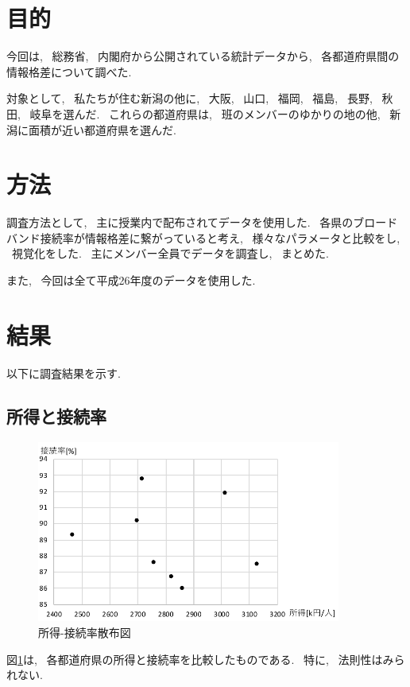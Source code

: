 \documentclass{jsarticle}
\begin{document}
\section{目的}
    今回は, ~総務省, ~内閣府から公開されている統計データから,
    ~各都道府県間の情報格差について調べた.

    対象として, ~私たちが住む新潟の他に, ~大阪, ~山口, ~福岡,
    ~福島, ~長野, ~秋田, ~岐阜を選んだ.
    ~これらの都道府県は, ~班のメンバーのゆかりの地の他,
    ~新潟に面積が近い都道府県を選んだ.

\section{方法}
    調査方法として, ~主に授業内で配布されてデータを使用した.
    ~各県のブロードバンド接続率が情報格差に繋がっていると考え,
    ~様々なパラメータと比較をし, ~視覚化をした.
    ~主にメンバー全員でデータを調査し, ~まとめた.

    また, ~今回は全て平成26年度のデータを使用した.

\section{結果}
    以下に調査結果を示す.

    \subsection{所得と接続率}
        \begin{figure}[h]
            \begin{center}
                \includegraphics[width=10cm]{syotoku.pdf}
                \caption{所得-接続率散布図}
                \label{fig:所得}
            \end{center}     
        \end{figure}

        図\ref{fig:所得}は, ~各都道府県の所得と接続率を比較したものである.
        ~特に, ~法則性はみられない.
\end{document}
